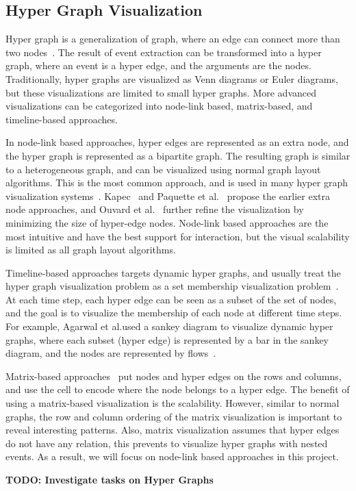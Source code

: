 \subsection{Hyper Graph Visualization}
Hyper graph is a generalization of graph, where an edge can connect more than two nodes~\cite{fischer2021hypergraphsurvey}.
The result of event extraction can be transformed into a hyper graph, where an event is a hyper edge, and the arguments are the nodes.
Traditionally, hyper graphs are visualized as Venn diagrams or Euler diagrams, but these visualizations are limited to small hyper graphs.
More advanced visualizations can be categorized into node-link based, matrix-based, and timeline-based approaches.

In node-link based approaches, hyper edges are represented as an extra node, and the hyper graph is represented as a bipartite graph.
The resulting graph is similar to a heterogeneous graph, and can be visualized using normal graph layout algorithms.
This is the most common approach, and is used in many hyper graph visualization systems~\cite{kapec2010visualizing, paquette2011hypergraph, kerren2013radial, ouvrard2017networks, jacobsen2020metrosets}.
Kapec~\cite{kapec2010visualizing} and Paquette et al.~\cite{paquette2011hypergraph} propose the earlier extra node approaches, 
and Ouvard et al.~\cite{ouvrard2017networks} further refine the visualization by minimizing the size of hyper-edge nodes.
Node-link based approaches are the most intuitive and have the best support for interaction, but the visual scalability is limited as all graph layout algorithms.

Timeline-based approaches targets dynamic hyper graphs, and usually treat the hyper graph visualization problem as a set membership visualization problem~\cite{agarwal2020setstreams, nguyen2016timesets, valdivia2019analyzing}.
At each time step, each hyper edge can be seen as a subset of the set of nodes, and the goal is to visualize the membership of each node at different time steps.
For example, Agarwal et al.used a sankey diagram to visualize dynamic hyper graphs, where each subset (hyper edge) is represented by a bar in the sankey diagram, and the nodes are represented by flows~\cite{agarwal2020setstreams,}.

Matrix-based approaches~\cite{streeb2019visual, fischer2020visual} put nodes and hyper edges on the rows and columns, and use the cell to encode where the node belongs to a hyper edge.
The benefit of using a matrix-based visualization is the scalability. 
However, similar to normal graphs, the row and column ordering of the matrix visualization is important to reveal interesting patterns.
Also, matrix visualization assumes that hyper edges do not have any relation, this prevents to visualize hyper graphs with nested events.
As a result, we will focus on node-link based approaches in this project.

\textbf{TODO: Investigate tasks on Hyper Graphs}





